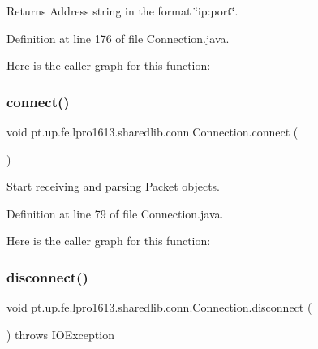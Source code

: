 \begin{DoxyReturn}{Returns}
Address string in the format \char`\"{}ip\+:port\char`\"{}. 
\end{DoxyReturn}


Definition at line 176 of file Connection.\+java.

Here is the caller graph for this function\+:
\hypertarget{classpt_1_1up_1_1fe_1_1lpro1613_1_1sharedlib_1_1conn_1_1_connection_a8ccfed3defecf3a4070c32a0f3d6acb7}{}\label{classpt_1_1up_1_1fe_1_1lpro1613_1_1sharedlib_1_1conn_1_1_connection_a8ccfed3defecf3a4070c32a0f3d6acb7} 
\subsubsection{\texorpdfstring{connect()}{connect()}}
{\footnotesize\ttfamily void pt.\+up.\+fe.\+lpro1613.\+sharedlib.\+conn.\+Connection.\+connect (\begin{DoxyParamCaption}{ }\end{DoxyParamCaption})}

Start receiving and parsing \hyperlink{classpt_1_1up_1_1fe_1_1lpro1613_1_1sharedlib_1_1conn_1_1_packet}{Packet} objects. 

Definition at line 79 of file Connection.\+java.

Here is the caller graph for this function\+:
\hypertarget{classpt_1_1up_1_1fe_1_1lpro1613_1_1sharedlib_1_1conn_1_1_connection_a3f57700e6cf5cb4ae80ce06db37ab0fc}{}\label{classpt_1_1up_1_1fe_1_1lpro1613_1_1sharedlib_1_1conn_1_1_connection_a3f57700e6cf5cb4ae80ce06db37ab0fc} 
\subsubsection{\texorpdfstring{disconnect()}{disconnect()}}
{\footnotesize\ttfamily void pt.\+up.\+fe.\+lpro1613.\+sharedlib.\+conn.\+Connection.\+disconnect (\begin{DoxyParamCaption}{ }\end{DoxyParamCaption}) throws I\+O\+Exception}

